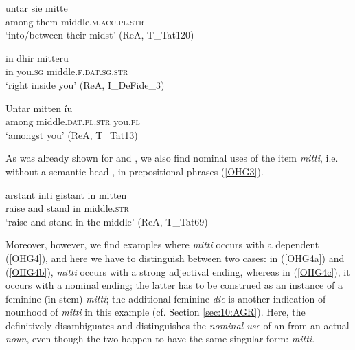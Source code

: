 \documentclass[output=paper,colorlinks,citecolor=brown]{langscibook}
\begin{document}
\begin{exe}
   \ex \label{OHG2} 
    \begin{xlist}
       \ex \gll untar sie mitte  \\ 
         among them  middle.\textsc{m.acc.pl.str}    \\
        \glt `into/between their midst' (ReA, T\_Tat120)
        
      \ex \gll in dhir mitteru   \\  
        in you.\textsc{sg} middle.\textsc{f.dat.sg.str}    \\ 
        \glt `right inside you' (ReA, I\_DeFide\_3) 
         
      \ex \label{OHG2c} \gll Untar mitten  íu   \\ 
          among middle.\textsc{dat.pl.str} you.\textsc{pl} \\ 
        \glt `amongst you' (ReA, T\_Tat13)
    \end{xlist}
\end{exe} 


As was already shown for  and  , we also find nominal uses of the item \textit{mitti}, i.e. without a semantic head , in prepositional phrases (\ref{OHG3}).

\begin{exe}
   \ex \label{OHG3} 
      \gll arstant inti gistant in  mitten  \\ 
         raise and stand in  middle.\textsc{str} \\ 
        \glt `raise and stand in the middle' (ReA, T\_Tat69)
\end{exe} 

 Moreover, however, we find examples where \textit{mitti} occurs with a  dependent (\ref{OHG4}), and here we have to  distinguish between two cases: in (\ref{OHG4a}) and (\ref{OHG4b}), \textit{mitti} occurs with a strong adjectival ending, whereas in (\ref{OHG4c}), it occurs with a nominal ending; the latter has to be construed as  an instance of a feminine (\={\i}n-stem)  \textit{mitti}; the additional feminine  \textit{die} is another indication of nounhood of \textit{mitti} in this example (cf. Section \ref{sec:10:AGR}). Here, the  definitively disambiguates and distinguishes the \textit{nominal use} of an  from an actual \textit{noun}, even though the two happen to have the same  singular form: \textit{mitti}.   %
\end{document}
